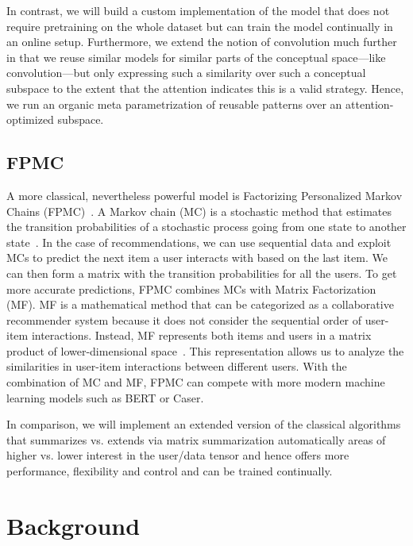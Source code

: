 In contrast, we will build a custom implementation of the model that does not require pretraining on the whole dataset but can train the model continually in an online setup. Furthermore, we extend the notion of convolution much further in that we reuse similar models for similar parts of the conceptual space---like convolution---but only expressing such a similarity over such a conceptual subspace to the extent that the attention indicates this is a valid strategy. Hence, we run an organic meta parametrization of reusable patterns over an attention-optimized subspace.

\subsection{FPMC}
A more classical, nevertheless powerful model is Factorizing Personalized Markov Chains (FPMC)~\cite{rendlefactorizing}. A Markov chain (MC) is a stochastic method that estimates the transition probabilities of a stochastic process going from one state to another state~\cite{kemeny1976markov}. In the case of recommendations, we can use sequential data and exploit MCs to predict the next item a user interacts with based on the last item. We can then form a matrix with the transition probabilities for all the users. To get more accurate predictions, FPMC combines MCs with Matrix Factorization (MF). MF is a mathematical method that can be categorized as a collaborative recommender system because it does not consider the sequential order of user-item interactions. Instead, MF represents both items and users in a matrix product of lower-dimensional space~\cite{koren2009matrix}. This representation allows us to analyze the similarities in user-item interactions between different users. With the combination of MC and MF, FPMC can compete with more modern machine learning models such as BERT or Caser.

In comparison, we will implement an extended version of the classical algorithms that summarizes vs. extends via matrix summarization automatically areas of higher vs. lower interest in the user/data tensor and hence offers more performance, flexibility and control and can be trained continually.


\section{Background}
